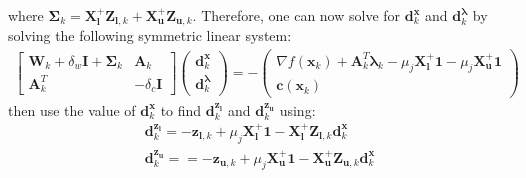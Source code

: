   where $\bm{\Sigma}_k = \bm{X}_{\bm{l}}^{+} \bm{Z}_{\bm{l},k} + \bm{X}_{\bm{u}}^{+} \bm{Z}_{\bm{u},k}$. Therefore, one can now solve for $\bm{d}_k^{\bm{x}}$ and $\bm{d}_k^{\bm{\lambda}}$ by solving the following symmetric linear system:
  \begin{align}
      \begin{bmatrix}
        \bm{W}_k + \delta_w \bm{I} + \bm{\Sigma}_k & \bm{A}_k \\
        \bm{A}_k^T & -\delta_c \bm{I}
      \end{bmatrix} \begin{pmatrix}
        \bm{d}_k^{\bm{x}} \\
        \bm{d}_k^{\bm{\lambda}}
      \end{pmatrix} = - \begin{pmatrix}
        \nabla f(\bm{x}_k) + \bm{A}_k^T \bm{\lambda}_k - \mu_j \bm{X}_{\bm{l}}^{+} \bm{1} - \mu_j \bm{X}_{\bm{u}}^{+} \bm{1}  \\
        \bm{c}(\bm{x}_k)
      \end{pmatrix}
  \end{align}  
  then use the value of $\bm{d}_k^{\bm{x}}$ to find $\bm{d}_k^{\bm{z}_{\bm{l}}}$ and $\bm{d}_k^{\bm{z}_{\bm{u}}}$ using:
  \begin{align}
      \bm{d}_k^{\bm{z}_{\bm{l}}} = - \bm{z}_{\bm{l}, k} + \mu_j \bm{X}_{\bm{l}}^{+} \bm{1} - \bm{X}_{\bm{l}}^{+} \bm{Z}_{\bm{l}, k} \bm{d}_k^{\bm{x}} \\
      \bm{d}_k^{\bm{z}_{\bm{u}}} =  = - \bm{z}_{\bm{u}, k} + \mu_j \bm{X}_{\bm{u}}^{+} \bm{1} - \bm{X}_{\bm{u}}^{+} \bm{Z}_{\bm{u}, k} \bm{d}_k^{\bm{x}}
  \end{align}


